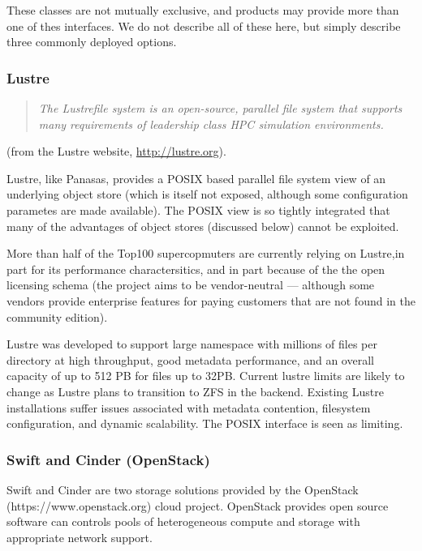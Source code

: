 These classes are not mutually exclusive, and products may provide more than
one of thes interfaces.  We do not describe all of these here, but simply describe
three commonly deployed options.
\subsubsection{Lustre}

\begin{quote}
\itshape
The Lustre\textregistered file system is an open-source, parallel file system that supports many requirements of leadership class HPC simulation environments.
\end{quote}
(from the Lustre website, \url{http://lustre.org}).

Lustre, like Panasas, provides a POSIX based parallel file system view of an underlying object store (which is itself not exposed, although some configuration parametes are made available). The POSIX view is so tightly integrated that
many of the advantages of object stores (discussed below) cannot be exploited.

More than half of the Top100 supercopmuters are currently relying on Lustre,in part for its performance charactersitics, and in part because of the the open licensing schema (the project aims to be vendor-neutral --- although some vendors provide enterprise features for paying customers that are not found in the community edition).

Lustre was developed to support large namespace with millions of files per directory at high throughput, good metadata performance, and an overall capacity of up to 512 PB for files up to 32PB. Current lustre limits are likely to change as Lustre plans to transition to ZFS in the backend. Existing Lustre installations suffer
issues associated with metadata contention, filesystem configuration, and dynamic
scalability. The POSIX interface is seen as limiting.


\subsubsection{Swift and Cinder (OpenStack)}

Swift and Cinder are two storage solutions provided by the OpenStack (https://www.openstack.org) cloud project. OpenStack provides open source
software can controls pools of heterogeneous compute and storage
with appropriate network support.

